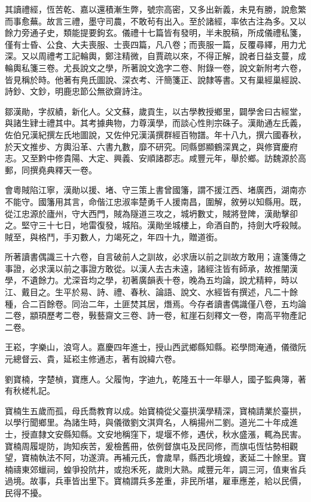 \begin{pinyinscope}
其讀禮經，恆苦乾、嘉以還積漸生弊，號宗高密，又多出新義，未見有勝，說愈繁而事愈蕪。故言三禮，墨守司農，不敢茍有出入。至於諸經，率依古注為多。又以餘力旁通子史，類能提要鉤玄。儀禮十七篇皆有發明，半未脫稿，所成儀禮私箋，僅有士昏、公食、大夫喪服、士喪四篇，凡八卷；而喪服一篇，反覆尋繹，用力尤深。又以周禮考工記輪輿，鄭注精微，自賈疏以來，不得正解，說者日益支蔓，成輪輿私箋三卷。尤長說文之學，所著說文逸字二卷、附錄一卷，說文新附考六卷，皆見稱於時。他著有鳧氏圖說、深衣考、汗簡箋正、說隸等書。又有巢經巢經說、詩鈔、文鈔，明鹿忠節公無欲齋詩注。

鄒漢勛，字叔績，新化人。父文蘇，歲貢生，以古學教授鄉里，闢學舍曰古經堂，與諸生肄士禮其中。其考據典物，力尊漢學，而談心性則宗硃子。漢勛通左氏義，佐伯兄漢紀撰左氏地圖說，又佐仲兄漢潢撰群經百物譜。年十八九，撰六國春秋，於天文推步、方輿沿革、六書九數，靡不研究。同縣鄧顯鶴深異之，與修寶慶府志。又至黔中修貴陽、大定、興義、安順諸郡志。咸豐元年，舉於鄉。訪魏源於高郵，同撰堯典釋天一卷。

會粵賊陷江寧，漢勛以援、堵、守三策上書曾國籓，謂不援江西、堵廣西，湖南亦不能守。國籓用其言，命偕江忠淑率楚勇千人援南昌，圍解，敘勞以知縣用。既，從江忠源於廬州，守大西門，賊為隧道三攻之，城坍數丈，賊將登陴，漢勛擊卻之。堅守三十七日，地雷復發，城陷。漢勛坐城樓上，命酒自酌，持劍大呼殺賊。賊至，與格鬥，手刃數人，力竭死之，年四十九，贈道銜。

所著讀書偶識三十六卷，自言破前人之訓故，必求唐以前之訓故方敢用；違箋傳之事證，必求漢以前之事證方敢從。以漢人去古未遠，諸經注皆有師承，故推闡漢學，不遺餘力。尤深音均之學，初著廣韻表十卷，晚為五均論，說尤精粹，時以江、戴目之。生平於易、詩、禮、春秋、論語、說文、水經皆有撰述，凡二十餘種，合二百餘卷。同治二年，土匪焚其居，熸焉。今存者讀書偶識僅八卷，五均論二卷，顓頊歷考二卷，斅藝齋文三卷、詩一卷，紅崖石刻釋文一卷，南高平物產記二卷。

王崧，字樂山，浪穹人。嘉慶四年進士，授山西武鄉縣知縣。崧學問淹通，儀徵阮元總督云、貴，延崧主修通志，著有說緯六卷。

劉寶楠，字楚楨，寶應人。父履恂，字迪九，乾隆五十一年舉人，國子監典簿，著有秋槎札記。

寶楠生五歲而孤，母氏喬教育以成。始寶楠從父臺拱漢學精深，寶楠請業於臺拱，以學行聞鄉里。為諸生時，與儀徵劉文淇齊名，人稱揚州二劉。道光二十年成進士，授直隸文安縣知縣。文安地稱窪下，堤堰不修，遇伏，秋水盛漲，輒為民害。寶楠周履堤防，詢知疾苦，爰檢舊冊，依例督旗屯及民同修，而旗屯恆怙勢相觀望，寶楠執法不阿，功遂濟。再補元氏，會歲旱，縣西北境蝗，袤延二十餘里。寶楠禱東郊蠟祠，蝗爭投阬井，或抱禾死，歲則大熟。咸豐元年，調三河，值東省兵過境。故事，兵車皆出里下。寶楠謂兵多差重，非民所堪，雇車應差，給以民價，民得不擾。


\end{pinyinscope}
